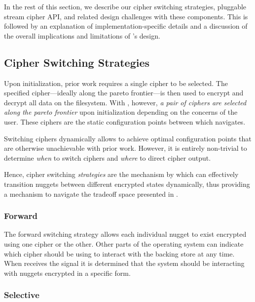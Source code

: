 In the rest of this section, we describe our cipher switching strategies,
pluggable stream cipher API, and related design challenges with these
components. This is followed by an explanation of implementation-specific
details and a discussion of the overall implications and limitations of
\SYSTEM{}'s design.

\subsection{Cipher Switching Strategies}

Upon initialization, prior work requires a single cipher to be selected. The
specified cipher---ideally along the pareto frontier---is then used to encrypt
and decrypt all data on the filesystem. With \SYSTEM{}, however, \emph{a pair of
ciphers are selected along the pareto frontier} upon initialization depending on
the concerns of the user. These ciphers are the static configuration points
between which \SYSTEM{} navigates.

Switching ciphers dynamically allows \SYSTEM{} to achieve optimal configuration
points that are otherwise unachievable with prior work. However, it is entirely
non-trivial to determine \emph{when} to switch ciphers and \emph{where} to
direct cipher output.

Hence, cipher switching \emph{strategies} are the mechanism by which \SYSTEM{}
can effectively transition nuggets between different encrypted states
dynamically, thus providing a mechanism to navigate the tradeoff space presented
in
. 

\subsubsection{Forward}

The forward switching strategy allows each individual nugget to exist encrypted
using one cipher or the other. Other parts of the operating system can indicate
which cipher \SYSTEM{} should be using to interact with the backing store at any
time. When \SYSTEM{} receives the signal it is determined that the system should be interacting with nuggets
encrypted in a specific form.

\subsubsection{Selective}


